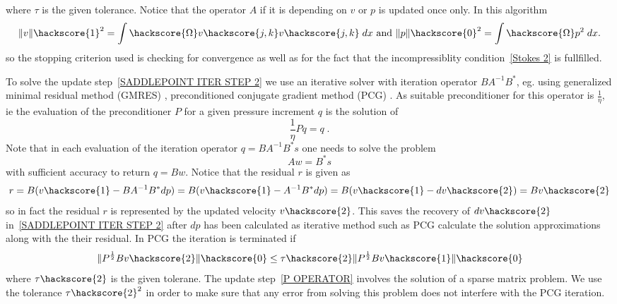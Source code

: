 where $\tau$ is the given tolerance. Notice that the operator $A$ if it is depending on $v$ or $p$ is updated once only. In this algorithm 
\begin{equation}
\|v\|\hackscore{1}^2 = \int\hackscore{\Omega} v\hackscore{j,k}v\hackscore{j,k} \; dx 
\mbox{ and }
\|p\|\hackscore{0}^2= \int\hackscore{\Omega} p^2 \; dx.
\label{STOKES STOP}
\end{equation}
so the stopping criterion used is checking for convergence as well as for 
the fact that the incompressiblity condition~\ref{Stokes 2} is fullfilled.

To solve the update step~\ref{SADDLEPOINT ITER STEP 2} we use an iterative solver with iteration 
operator $B A^{-1} B^{*}$, eg. using generalized minimal residual method (GMRES) , preconditioned conjugate gradient method (PCG) . As suitable preconditioner  for this operator is $\frac{1}{\eta}$, ie 
the evaluation of the preconditioner $P$ for a given pressure increment $q$ is the solution of
\begin{equation} \label{P PREC}
\frac{1}{\eta} Pq = q \; . 
\end{equation}
Note that in each evaluation of the iteration operator $q=B A^{-1} B^{*} s$ one needs to solve
the problem
\begin{equation} \label{P OPERATOR}
A w = B^{*} s 
\end{equation}
with sufficient accuracy to return $q=Bw$. Notice that the residual $r$ is given as
\begin{equation} \label{STOKES RES }
 r= B (v\hackscore{1} - B A^{-1} B^{*} dp) =  B (v\hackscore{1} - A^{-1} B^{*} dp) = B (v\hackscore{1}-dv\hackscore{2}) = B v\hackscore{2}
\end{equation}
so in fact the residual $r$ is represented by the updated velocity $v\hackscore{2}$. This saves the recovery of 
$dv\hackscore{2}$ in~\ref{SADDLEPOINT ITER STEP 2} after $dp$ has been calculated as iterative method such as PCG calculate the solution approximations along with the their residual. In PCG the iteration is terminated if
\begin{equation} \label{P OPERATOR}
\| P^{\frac{1}{2}}B v\hackscore{2} \|\hackscore{0} \le \tau\hackscore{2} \| P^{\frac{1}{2}}B v\hackscore{1} \|\hackscore{0}
\end{equation}
where $\tau\hackscore{2}$ is the given tolerane. The update step~\ref{P OPERATOR} involves the 
solution of a sparse matrix problem. We use the tolerance $\tau\hackscore{2}^2$ in order to make sure that any
error from solving this problem does not interfere with the PCG iteration.




